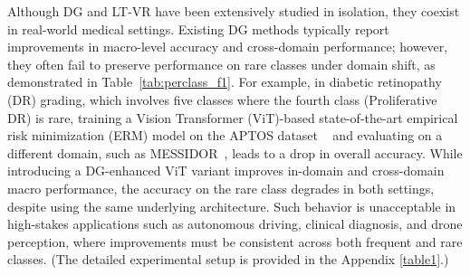 \documentclass{article}
\begin{document}
Although DG and LT-VR have been extensively studied in isolation, they coexist in real-world medical settings. Existing DG methods typically report improvements in macro-level accuracy and cross-domain performance; however, they often fail to preserve performance on rare classes under domain shift, as demonstrated in Table~\ref{tab:perclass_f1}. For example, in diabetic retinopathy (DR) grading, which involves five classes where the fourth class (Proliferative DR) is rare, training a Vision Transformer (ViT)-based state-of-the-art empirical risk minimization (ERM) model on the APTOS dataset ~\cite{APTOS2019} and evaluating on a different domain, such as MESSIDOR~\cite{Abramoff2016Messidor}, leads to a drop in overall accuracy. While introducing a DG-enhanced ViT variant \cite{Galappaththige2024} improves in-domain and cross-domain macro performance, the accuracy on the rare class degrades in both settings, despite using the same underlying architecture. Such behavior is unacceptable in high-stakes applications such as autonomous driving, clinical diagnosis, and drone perception, where improvements must be consistent across both frequent and rare classes. (The detailed experimental setup is provided in the Appendix \ref{table1}.)




\end{document}
